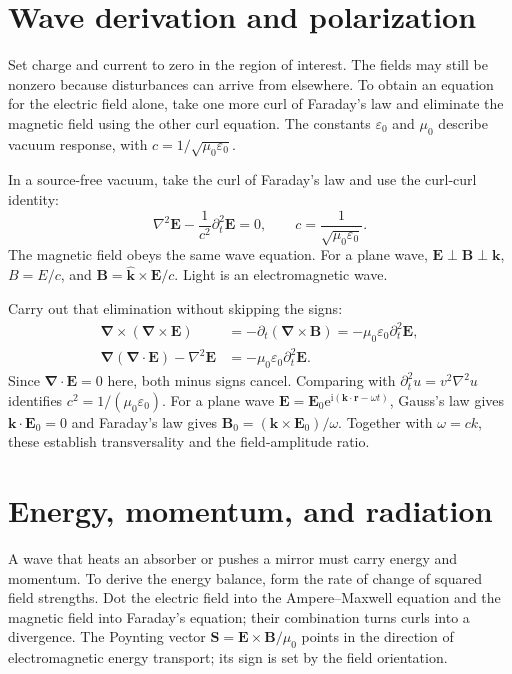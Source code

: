 \documentclass[11pt,oneside]{book}
\newcommand{\ii}{\mathrm{i}}
\newcommand{\ee}{\mathrm{e}}
\newcommand{\vect}[1]{\boldsymbol{#1}}
\newcommand{\grad}{\boldsymbol{\nabla}}
\newcommand{\lap}{\nabla^2}
\newcommand{\eps}{\varepsilon_0}
\newcommand{\mun}{\mu_0}
\theoremstyle{reviewstyle}
\begin{document}
\section{Wave derivation and polarization}
Set charge and current to zero in the region of interest. The fields may still be nonzero because disturbances can arrive from elsewhere. To obtain an equation for the electric field alone, take one more curl of Faraday's law and eliminate the magnetic field using the other curl equation. The constants $\eps$ and $\mun$ describe vacuum response, with $c=1/\sqrt{\mun\eps}$.

In a source-free vacuum, take the curl of Faraday's law and use the curl-curl identity:
\begin{equation}\lap\vect E-\frac1{c^2}\partial_t^2\vect E=0,\qquad c=\frac1{\sqrt{\mun\eps}}.\end{equation}
The magnetic field obeys the same wave equation. For a plane wave, $\vect E\perp\vect B\perp\vect k$, $B=E/c$, and
$\vect B=\hat{\vect k}\times\vect E/c$. Light is an electromagnetic wave.

Carry out that elimination without skipping the signs:
\begin{align}
\grad\times(\grad\times\vect E)
&=-\partial_t(\grad\times\vect B)
=-\mun\eps\partial_t^2\vect E,\\
\grad(\grad\cdot\vect E)-\lap\vect E
&=-\mun\eps\partial_t^2\vect E.
\end{align}
Since $\grad\cdot\vect E=0$ here, both minus signs cancel. Comparing with $\partial_t^2u=v^2\lap u$ identifies $c^2=1/(\mun\eps)$. For a plane wave $\vect E=\vect E_0\ee^{\ii(\vect k\cdot\vect r-\omega t)}$, Gauss's law gives $\vect k\cdot\vect E_0=0$ and Faraday's law gives $\vect B_0=(\vect k\times\vect E_0)/\omega$. Together with $\omega=ck$, these establish transversality and the field-amplitude ratio.

\section{Energy, momentum, and radiation}
A wave that heats an absorber or pushes a mirror must carry energy and momentum. To derive the energy balance, form the rate of change of squared field strengths. Dot the electric field into the Ampere--Maxwell equation and the magnetic field into Faraday's equation; their combination turns curls into a divergence. The Poynting vector $\vect S=\vect E\times\vect B/\mun$ points in the direction of electromagnetic energy transport; its sign is set by the field orientation.
\end{document}
